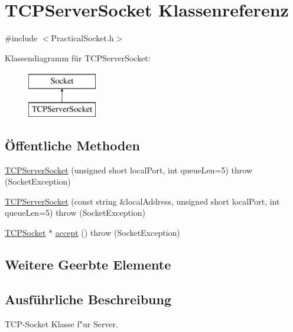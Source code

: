 \hypertarget{classTCPServerSocket}{\section{T\-C\-P\-Server\-Socket Klassenreferenz}
\label{classTCPServerSocket}
}


{\ttfamily \#include $<$Practical\-Socket.\-h$>$}

Klassendiagramm für T\-C\-P\-Server\-Socket\-:\begin{figure}[H]
\begin{center}
\leavevmode
\includegraphics[height=2.000000cm]{classTCPServerSocket}
\end{center}
\end{figure}
\subsection*{Öffentliche Methoden}
\begin{DoxyCompactItemize}
\item 
\hyperlink{classTCPServerSocket_ae559a3154527d09fe14a8e5ee1f53d7a}{T\-C\-P\-Server\-Socket} (unsigned short local\-Port, int queue\-Len=5)  throw (\-Socket\-Exception)
\item 
\hyperlink{classTCPServerSocket_a3908fecb1b038f7c14fcc7726f54d01d}{T\-C\-P\-Server\-Socket} (const string \&local\-Address, unsigned short local\-Port, int queue\-Len=5)  throw (\-Socket\-Exception)
\item 
\hyperlink{classTCPSocket}{T\-C\-P\-Socket} $\ast$ \hyperlink{classTCPServerSocket_a1d161137e1b069de7a7bfc14d3f8212c}{accept} ()  throw (\-Socket\-Exception)
\end{DoxyCompactItemize}
\subsection*{Weitere Geerbte Elemente}


\subsection{Ausführliche Beschreibung}
T\-C\-P-\/\-Socket Klasse f"ur Server. 

